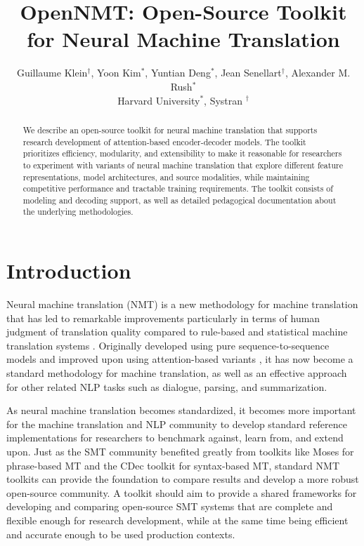 \documentclass[11pt]{article}
\title{OpenNMT: Open-Source Toolkit for Neural Machine Translation}
\author{Guillaume Klein$^\dagger$, Yoon Kim$^*$, Yuntian Deng$^*$, Jean Senellart$^\dagger$, Alexander M. Rush$^*$ \\ Harvard University$^*$, Systran $^\dagger$}
\date{}
\begin{document}
\maketitle
\begin{abstract}

  We describe an open-source toolkit for neural machine translation
  that supports research development of attention-based
  encoder-decoder models.  The toolkit prioritizes efficiency,
  modularity, and extensibility to make it reasonable for researchers to
  experiment with variants of neural machine translation that explore
  different feature representations, model architectures, and source
  modalities, while maintaining competitive performance and
  tractable training requirements. The toolkit consists of modeling
  and decoding support, as well as detailed pedagogical documentation
  about the underlying methodologies.

\end{abstract}

\section{Introduction}


Neural machine translation (NMT) is a new methodology for machine
translation that has led to remarkable improvements particularly in
terms of human judgment of translation quality compared to rule-based
and statistical machine translation systems
\cite{wu2016google,systran}. Originally developed using pure
sequence-to-sequence models \cite{sutskever14sequence,Cho2014} and
improved upon using attention-based variants \cite{Bahdanau2015,
  Luong2015}, it has now become a standard methodology for machine
translation, as well as an effective approach for other related NLP
tasks such as dialogue, parsing, and summarization.

As neural machine translation becomes standardized, it becomes more
important for the machine translation and NLP community to develop
standard reference implementations for researchers to benchmark
against, learn from, and extend upon. Just as the SMT community
benefited greatly from toolkits like Moses \cite{koehn2007moses} for phrase-based MT
and the CDec toolkit \cite{dyer2010cdec} for syntax-based MT, standard NMT
toolkits can provide the foundation to compare results and develop a
more robust open-source community. A toolkit should aim to
provide a shared frameworks for developing and comparing open-source
SMT systems that are complete and flexible enough for research
development, while at the same time being efficient and accurate
enough to be used production contexts. 
\end{document}
